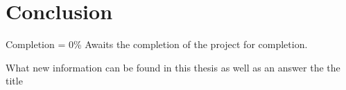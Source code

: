 \chapter{Conclusion}

Completion = 0\%
Awaits the completion of the project for completion.

What new information can be found in this thesis as well as an answer the the title